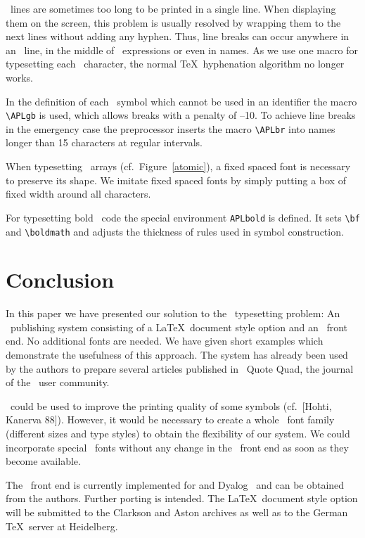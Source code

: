 \APL\ lines are sometimes too long to be
printed in a single line. When displaying
them on the screen, this problem is usually resolved
by wrapping them to the next lines without
adding any hyphen. Thus, line breaks can occur
anywhere in an \APL\ line, in the middle of
\APL\ expressions or even in names.
As we use one macro for typesetting each \APL\
character, the normal \TeX\ hyphenation algorithm
no longer works. 

In the definition of each \APL\ symbol which cannot be used in an
identifier the macro \verb+\APLgb+ is used, which allows breaks with a
penalty of --10.  To achieve line breaks in the emergency case the
preprocessor inserts the macro \verb+\APLbr+ into names longer than 15
characters at regular intervals.

When typesetting \APL\ arrays (cf.\ Figure~\ref{atomic}),
a fixed spaced font is necessary to preserve its
shape. We imitate fixed spaced fonts by simply putting
a box of fixed width around all characters.
 
For typesetting bold \APL\ code the special environment {\tt APLbold}
is defined. It sets \verb+\bf+ and \verb+\boldmath+ and adjusts
the thickness of rules used in symbol construction.
 
\section{Conclusion}
 
In this paper we have presented our solution to the \APL\
typesetting problem: An \APL\ publishing system
consisting of a \LaTeX\ \TUBedit{10}document style option and an
\APL\ \TUBedit{9}front end. No additional fonts are needed.
We have given short examples which
demonstrate the usefulness of this approach. The system
has already been used by the authors to prepare several
articles published in \APL\ Quote Quad, the journal of
the \APL\ user community.
 
\MF\ could be used to improve the printing quality
of some symbols (cf.~[Hohti, Kanerva 88]\nocite{Hohti}).
However, it would be necessary to create a whole \APL\ font family
(different sizes and type styles) to obtain the flexibility
of our system.
We could incorporate special \APL\ fonts without
any change in the \APL\ front end as soon as they become available.
 
The \APL\ \TUBedit{9}front end is currently implemented
for  and Dyalog \APL\ and can be obtained from the authors.
Further porting
is intended.
The \LaTeX\ document style option will be submitted to the Clarkson
and Aston archives as well as to the German \TeX\ server
at Heidelberg.
 
